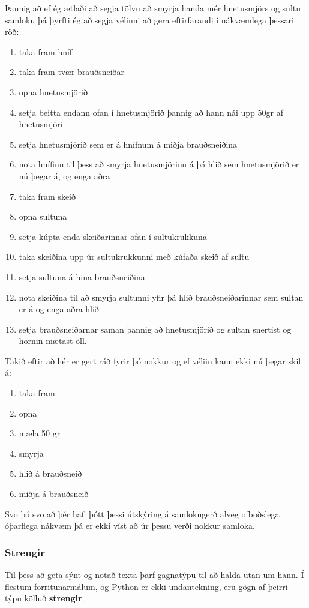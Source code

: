 \documentclass[11pt,fleqn]{book} %
\begin{document}
Þannig að ef ég ætlaði að segja tölvu að smyrja handa mér hnetusmjörs og sultu samloku þá þyrfti ég að segja vélinni að gera eftirfarandi í nákvæmlega þessari röð:

\begin{enumerate}
	\item taka fram hníf
	\item taka fram tvær brauðsneiðar
	\item opna hnetusmjörið
	\item setja beitta endann ofan í hnetusmjörið þannig að hann nái upp 50gr af hnetusmjöri
	\item setja hnetusmjörið sem er á hnífnum á miðja brauðsneiðina
	\item nota hnífinn til þess að smyrja hnetusmjörinu á þá hlið sem hnetusmjörið er nú þegar á, og enga aðra
	\item taka fram skeið
	\item opna sultuna
	\item setja kúpta enda skeiðarinnar ofan í sultukrukkuna 
	\item taka skeiðina upp úr sultukrukkunni með kúfaða skeið af sultu
	\item setja sultuna á hina brauðsneiðina
	\item nota skeiðina til að smyrja sultunni yfir þá hlið brauðsneiðarinnar sem sultan er á og enga aðra hlið
	\item  setja brauðsneiðarnar saman þannig að hnetusmjörið og sultan snertist og hornin mætast öll. 
\end{enumerate} 

Takið eftir að hér er gert ráð fyrir þó nokkur og ef véliin kann ekki nú þegar skil á: 

\begin{enumerate}
	\item taka fram
	\item opna
	\item mæla 50 gr
	\item smyrja
	\item hlið á brauðsneið
	\item miðja á brauðsneið
\end{enumerate} 

Svo þó svo að þér hafi þótt þessi útskýring á samlokugerð alveg ofboðslega óþarflega nákvæm þá er ekki víst að úr þessu verði nokkur samloka.


\subsubsection{Strengir}
Til þess að geta sýnt og notað texta þarf gagnatýpu til að halda utan um hann. Í flestum forritunarmálum, og Python er ekki undantekning, eru gögn af þeirri týpu kölluð \textbf{strengir}. 
\end{document}
